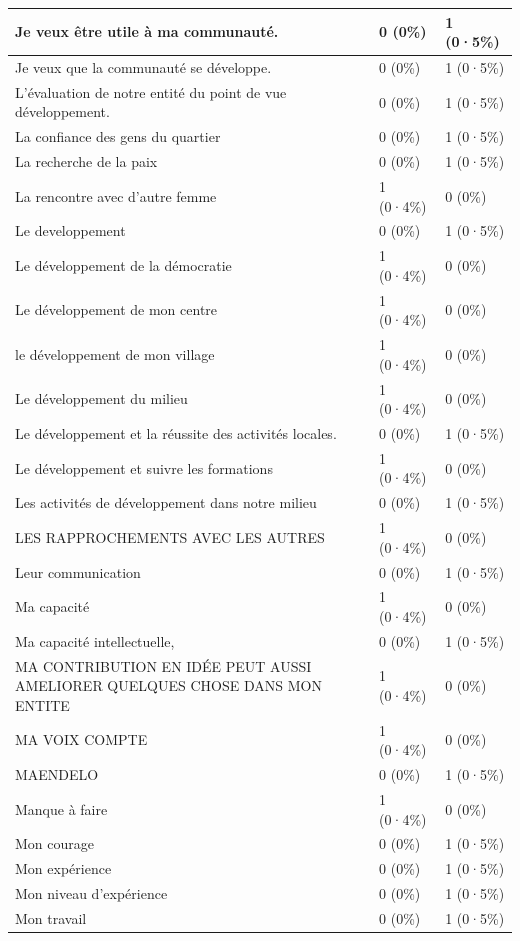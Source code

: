 \documentclass[
]{book}
\begin{document}
\begin{tabular}{l|l|l}
\hline
Je veux être utile à ma communauté. & 0 (0\%) & 1 (0·5\%)\\
\hline
Je veux que la communauté se développe. & 0 (0\%) & 1 (0·5\%)\\
\hline
L'évaluation de notre entité du point de vue développement. & 0 (0\%) & 1 (0·5\%)\\
\hline
La confiance des gens du quartier & 0 (0\%) & 1 (0·5\%)\\
\hline
La recherche de la paix & 0 (0\%) & 1 (0·5\%)\\
\hline
La rencontre avec d'autre femme & 1 (0·4\%) & 0 (0\%)\\
\hline
Le developpement & 0 (0\%) & 1 (0·5\%)\\
\hline
Le développement de la démocratie & 1 (0·4\%) & 0 (0\%)\\
\hline
Le développement de mon centre & 1 (0·4\%) & 0 (0\%)\\
\hline
le développement de mon village & 1 (0·4\%) & 0 (0\%)\\
\hline
Le développement du milieu & 1 (0·4\%) & 0 (0\%)\\
\hline
Le développement et la réussite des activités locales. & 0 (0\%) & 1 (0·5\%)\\
\hline
Le développement et suivre les formations & 1 (0·4\%) & 0 (0\%)\\
\hline
Les activités de développement dans notre milieu & 0 (0\%) & 1 (0·5\%)\\
\hline
LES RAPPROCHEMENTS AVEC LES AUTRES & 1 (0·4\%) & 0 (0\%)\\
\hline
Leur communication & 0 (0\%) & 1 (0·5\%)\\
\hline
Ma capacité & 1 (0·4\%) & 0 (0\%)\\
\hline
Ma capacité intellectuelle, & 0 (0\%) & 1 (0·5\%)\\
\hline
MA CONTRIBUTION EN IDÉE PEUT AUSSI AMELIORER QUELQUES CHOSE DANS MON ENTITE & 1 (0·4\%) & 0 (0\%)\\
\hline
MA VOIX COMPTE & 1 (0·4\%) & 0 (0\%)\\
\hline
MAENDELO & 0 (0\%) & 1 (0·5\%)\\
\hline
Manque à faire & 1 (0·4\%) & 0 (0\%)\\
\hline
Mon courage & 0 (0\%) & 1 (0·5\%)\\
\hline
Mon expérience & 0 (0\%) & 1 (0·5\%)\\
\hline
Mon niveau d'expérience & 0 (0\%) & 1 (0·5\%)\\
\hline
Mon travail & 0 (0\%) & 1 (0·5\%)\\

\end{tabular}
\end{document}
